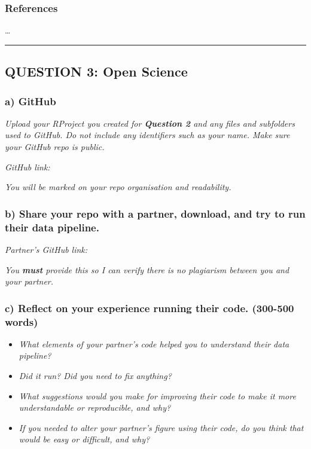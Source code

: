 \documentclass[
]{article}
\begin{document}
\subsubsection{References}\label{references}

\ldots{}

\begin{center}\rule{0.5\linewidth}{0.5pt}\end{center}

\subsection{QUESTION 3: Open Science}\label{question-3-open-science}

\subsubsection{a) GitHub}\label{a-github}

\emph{Upload your RProject you created for \textbf{Question 2} and any
files and subfolders used to GitHub. Do not include any identifiers such
as your name. Make sure your GitHub repo is public.}

\emph{GitHub link:}

\emph{You will be marked on your repo organisation and readability.}

\subsubsection{b) Share your repo with a partner, download, and try to
run their data
pipeline.}\label{b-share-your-repo-with-a-partner-download-and-try-to-run-their-data-pipeline.}

\emph{Partner's GitHub link:}

\emph{You \textbf{must} provide this so I can verify there is no
plagiarism between you and your partner.}

\subsubsection{c) Reflect on your experience running their code.
(300-500
words)}\label{c-reflect-on-your-experience-running-their-code.-300-500-words}

\begin{itemize}
\item
  \emph{What elements of your partner's code helped you to understand
  their data pipeline?}
\item
  \emph{Did it run? Did you need to fix anything?}
\item
  \emph{What suggestions would you make for improving their code to make
  it more understandable or reproducible, and why?}
\item
  \emph{If you needed to alter your partner's figure using their code,
  do you think that would be easy or difficult, and why?}
\end{itemize}
\end{document}
